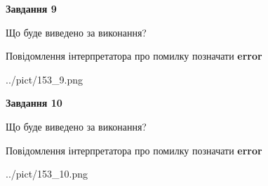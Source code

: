 \documentclass[12pt, ukrainian]{article}
\begin{document}
{{\begin {center}\textbf{Завдання 9}\end {center}}\par
Що буде виведено за виконання? \par
Повідомлення інтерпретатора про помилку позначати \textbf{error}

\begin{center}
	{../pict/153_9.png}
\end{center}
\newpage

{\begin {center}\textbf{Завдання 10}\end {center}}\par
Що буде виведено за виконання? \par
Повідомлення інтерпретатора про помилку позначати \textbf{error}

\begin{center}
	{../pict/153_10.png}
\end{center}
\newpage

}
\end{document}
